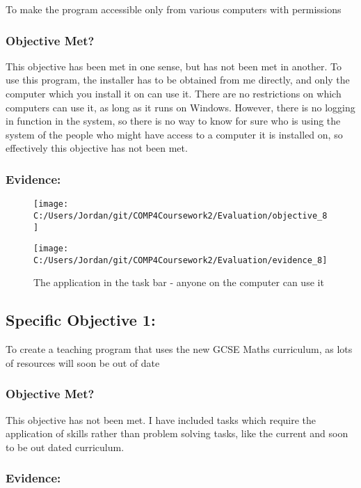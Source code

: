 To make the program accessible only from various computers with permissions

\subsubsection{Objective Met?}

This objective has been met in one sense, but has not been met in another. To use this program, the installer has to be obtained from me directly, and only the computer which you install it on can use it. There are no restrictions on which computers can use it, as long as it runs on Windows. However, there is no logging in function in the system, so there is no way to know for sure who is using the system of the people who might have access to a computer it is installed on, so effectively this objective has not been met.

\subsubsection{Evidence: }

\begin{figure}[H]
	\texttt{[image: C:/Users/Jordan/git/COMP4Coursework2/Evaluation/objective\_8]}
\end{figure}

\begin{figure}[H]
	\texttt{[image: C:/Users/Jordan/git/COMP4Coursework2/Evaluation/evidence\_8]}
	\caption{The application in the task bar - anyone on the computer can use it}
\end{figure}

\subsection{Specific Objective 1: }

To create a teaching program that uses the new GCSE Maths curriculum, as lots of resources will soon be out of date

\subsubsection{Objective Met?}

This objective has not been met. I have included tasks which require the application of skills rather than problem solving tasks, like the current and soon to be out dated curriculum.

\subsubsection{Evidence: }

